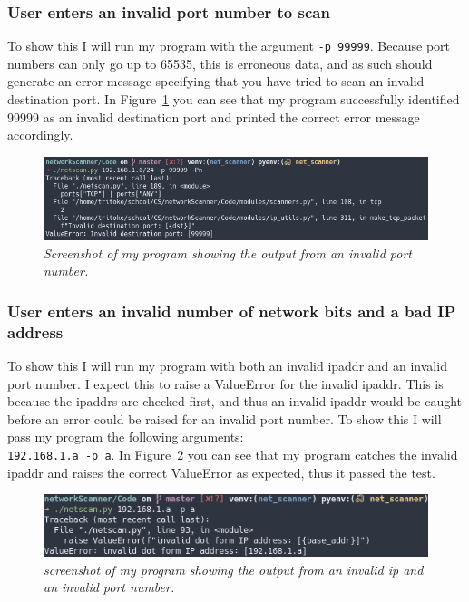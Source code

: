 \documentclass[titlepage]{article}
\let\Oldsubsubsection\subsubsection{}
\renewcommand{\subsubsection}{\FloatBarrier\Oldsubsubsection}
\begin{document}
\subsubsection{User enters an invalid port number to scan}\label{test:invalidport}
To show this I will run my program with the argument \verb|-p 99999|.
Because port numbers can only go up to 65535, this is erroneous data,
and as such should generate an error message specifying that 
you have tried to scan an invalid destination port.
In Figure~\ref{invalidportnum} you can see that my program
successfully identified 99999 as an invalid destination port
and printed the correct error message accordingly.

\begin{figure}[H]
\centering
\includegraphics[width=\textwidth]{invalidportnum.png}
\caption{\textit{%
  Screenshot of my program showing the output from an invalid port number.
}}\label{invalidportnum}
\end{figure}

\subsubsection{User enters an invalid number of network bits and a bad IP address}\label{test:invalidaddressandnetworkbits}
To show this I will run my program with both an invalid \gls{ipaddr} and an
invalid port number. I expect this to raise a ValueError for the invalid \gls{ipaddr}.
This is because the \glspl{ipaddr} are checked first, and thus an invalid \gls{ipaddr}
would be caught before an error could be raised for an invalid port number.
To show this I will pass my program the following arguments: \\
\verb|192.168.1.a -p a|. In Figure~\ref{invalidipandport} you can see that
my program catches the invalid \gls{ipaddr} and raises the correct ValueError
as expected, thus it passed the test.

\begin{figure}[H]
\centering
\includegraphics[width=\textwidth]{invalidipandport.png}
\caption{\textit{%
  screenshot of my program showing the output from an invalid ip and an invalid port number.
}}\label{invalidipandport}
\end{figure}
\end{document}
